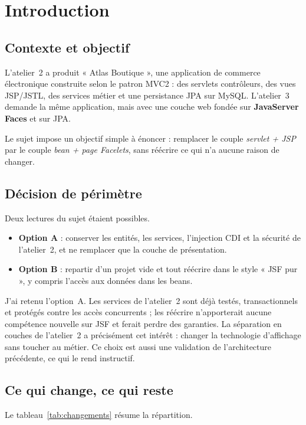 \chapter{Introduction}\label{chap:introduction}

\section{Contexte et objectif}
L'atelier~2 a produit « Atlas Boutique », une application de commerce électronique construite selon le patron MVC2 :
des servlets contrôleurs, des vues JSP/JSTL, des services métier et une persistance JPA sur MySQL. L'atelier~3
demande la même application, mais avec une couche web fondée sur \textbf{JavaServer Faces} \cite{jsf} et sur JPA.

Le sujet impose un objectif simple à énoncer : remplacer le couple \textit{servlet + JSP} par le couple
\textit{bean + page Facelets}, sans réécrire ce qui n'a aucune raison de changer.

\section{Décision de périmètre}
Deux lectures du sujet étaient possibles.

\begin{itemize}
  \item \textbf{Option A} : conserver les entités, les services, l'injection CDI et la sécurité de l'atelier~2, et ne
        remplacer que la couche de présentation.
  \item \textbf{Option B} : repartir d'un projet vide et tout réécrire dans le style « JSF pur », y compris l'accès aux
        données dans les beans.
\end{itemize}

J'ai retenu l'option~A. Les services de l'atelier~2 sont déjà testés, transactionnels et protégés contre les accès
concurrents ; les réécrire n'apporterait aucune compétence nouvelle sur JSF et ferait perdre des garanties. La
séparation en couches de l'atelier~2 a précisément cet intérêt : changer la technologie d'affichage sans toucher
au métier. Ce choix est aussi une validation de l'architecture précédente, ce qui le rend instructif.

\section{Ce qui change, ce qui reste}
Le tableau~\ref{tab:changements} résume la répartition.

